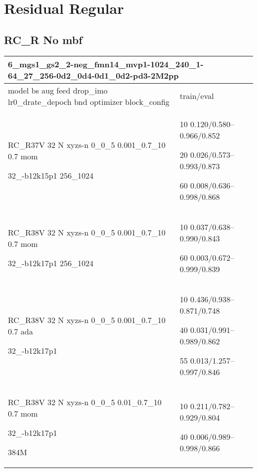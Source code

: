 \documentclass[,table,dvipsnames]{article}
\begin{document}
\section{Residual Regular}
\subsection{RC\_R No mbf}
\noindent\begin{tabular}{|p{10cm}|p{5cm}| }	
	\hline
	\multicolumn{2}{|p{15cm}|}{ 6\_mgs1\_gs2\_2-neg\_fmn14\_mvp1-1024\_240\_1-64\_27\_256-0d2\_0d4-0d1\_0d2-pd3-2M2pp}\\
	\hline
	model bs aug feed drop\_imo lr0\_drate\_depoch bnd optimizer block\_config & train/eval \\
	
	\rowcolor{red!20}
	RC\_R37V 32 N xyzs-n 0\_0\_5 0.001\_0.7\_10 0.7 mom \par 32\_-b12k15p1 256\_1024& 10 0.120/0.580--0.966/0.852 \par 20 0.026/0.573--0.993/0.873 \par 60 0.008/0.636--0.998/0.868\\
	
	\rowcolor{blue!20}
	RC\_R38V 32 N xyzs-n 0\_0\_5 0.001\_0.7\_10 0.7 mom \par 32\_-b12k17p1 256\_1024& 10 0.037/0.638--0.990/0.843\par 60 0.003/0.672--0.999/0.839\\
	
	\rowcolor{green!20}
	RC\_R38V 32 N xyzs-n 0\_0\_5 0.001\_0.7\_10 0.7 ada \par 32\_-b12k17p1& 10 0.436/0.938--0.871/0.748\par 40 0.031/0.991--0.989/0.862\par 55 0.013/1.257--0.997/0.846\\
	
	\rowcolor{yellow!20}
	RC\_R38V 32 N xyzs-n 0\_0\_5 0.01\_0.7\_10 0.7 mom \par 32\_-b12k17p1\par 384M& 10 0.211/0.782--0.929/0.804\par 40 0.006/0.989--0.998/0.866\\
	
	\hline 	
\end{tabular}
\end{document}
